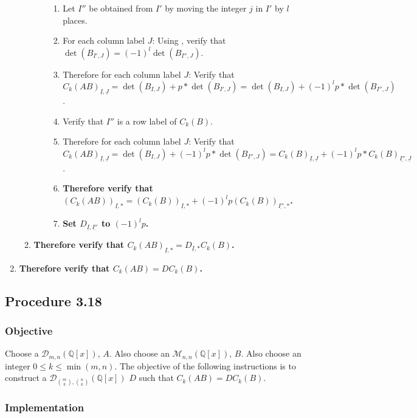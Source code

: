 \documentclass[twocolumn]{article}
\newcommand{\ul}[1]{\underline{#1}}
\newcommand{\procedure}[2][]{\subsection*{Procedure #2 \ifthenelse{\equal{#1}{}}{}{(#1)}}\label{sec:procedure #2}}
\newcommand{\objective}{\subsubsection*{Objective}}
\newcommand{\implementation}{\subsubsection*{Implementation}}
\newcommand{\procedurehr}[2][]{\hyperref[sec:procedure #2]{\ifthenelse{\equal{#1}{}}{procedure #2}{#1}}}
\begin{document}
\begin{enumerate}
\begin{enumerate}
\begin{enumerate}
\begin{enumerate}
								\item Let $I''$ be obtained from $I'$ by moving the integer $j$ in $I'$ by $l$ places.
								\item For each column label $J$: Using \procedurehr{3.14}, verify that $\det(B_{I',J})=(-1)^l\det(B_{I'',J})$.
								\item Therefore for each column label $J$: Verify that ${C_k(AB)}_{\ul{I},\ul{J}}=\det(B_{I,J})+p*\det(B_{I',J})=\det(B_{I,J})+(-1)^lp*\det(B_{I'',J})$.
								\item Verify that $I''$ is a row label of $C_k(B)$.
								\item Therefore for each column label $J$: Verify that ${C_k(AB)}_{\ul{I},\ul{J}}=\det(B_{I,J})+(-1)^lp*\det(B_{I'',J})={C_k(B)}_{\ul{I},\ul{J}}+(-1)^lp*{C_k(B)}_{\ul{I''},\ul{J}}$.
								\item \textbf{Therefore verify that $(C_k(AB))_{\ul{I},*}=(C_k(B))_{\ul{I},*}+(-1)^lp(C_k(B))_{\ul{I''},*}$.}
								\item \textbf{Set $D_{\ul{I},\ul{I''}}$ to $(-1)^lp$.}
							\end{enumerate}
						\end{enumerate}
						\item \textbf{Therefore verify that ${C_k(AB)}_{\ul{I},*}=D_{\ul{I},*}C_k(B)$.}
					\end{enumerate}
					\item \textbf{Therefore verify that $C_k(AB)=DC_k(B)$.}
				\end{enumerate}
		\procedure{3.18}
			\objective
				Choose a $\mathcal{D}_{m,n}(\mathbb{Q}[x])$, $A$. Also choose an $\mathcal{M}_{n,n}(\mathbb{Q}[x])$, $B$. Also choose an integer $0\le k\le\min(m,n)$. The objective of the following instructions is to construct a $\mathcal{D}_{\binom{m}{k},\binom{n}{k}}(\mathbb{Q}[x])$ $D$ such that $C_k(AB)=DC_k(B)$.
			\implementation
\end{document}
